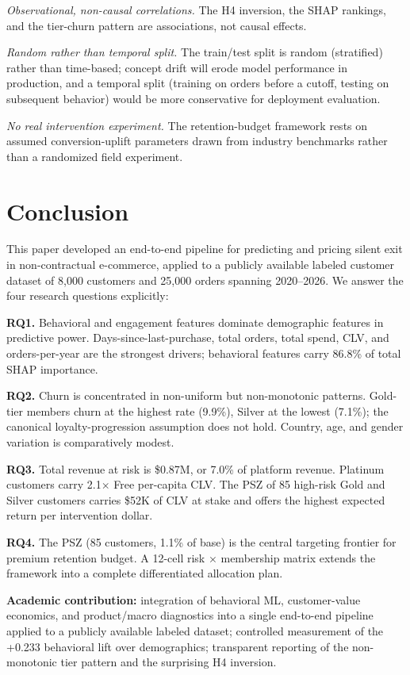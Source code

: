 \documentclass[conference]{IEEEtran}
\begin{document}
\emph{Observational, non-causal correlations.} The H4 inversion, the SHAP rankings, and the tier-churn pattern are associations, not causal effects.

\emph{Random rather than temporal split.} The train/test split is random (stratified) rather than time-based; concept drift will erode model performance in production, and a temporal split (training on orders before a cutoff, testing on subsequent behavior) would be more conservative for deployment evaluation.

\emph{No real intervention experiment.} The retention-budget framework rests on assumed conversion-uplift parameters drawn from industry benchmarks rather than a randomized field experiment.

\section{Conclusion}

This paper developed an end-to-end pipeline for predicting and pricing silent exit in non-contractual e-commerce, applied to a publicly available labeled customer dataset of 8{,}000 customers and 25{,}000 orders spanning 2020--2026. We answer the four research questions explicitly:

\textbf{RQ1.} Behavioral and engagement features dominate demographic features in predictive power. Days-since-last-purchase, total orders, total spend, CLV, and orders-per-year are the strongest drivers; behavioral features carry 86.8\% of total SHAP importance.

\textbf{RQ2.} Churn is concentrated in non-uniform but non-monotonic patterns. Gold-tier members churn at the highest rate (9.9\%), Silver at the lowest (7.1\%); the canonical loyalty-progression assumption does not hold. Country, age, and gender variation is comparatively modest.

\textbf{RQ3.} Total revenue at risk is \$0.87M, or 7.0\% of platform revenue. Platinum customers carry 2.1$\times$ Free per-capita CLV. The PSZ of 85 high-risk Gold and Silver customers carries \$52K of CLV at stake and offers the highest expected return per intervention dollar.

\textbf{RQ4.} The PSZ (85 customers, 1.1\% of base) is the central targeting frontier for premium retention budget. A 12-cell risk $\times$ membership matrix extends the framework into a complete differentiated allocation plan.

\textbf{Academic contribution:} integration of behavioral ML, customer-value economics, and product/macro diagnostics into a single end-to-end pipeline applied to a publicly available labeled dataset; controlled measurement of the +0.233 behavioral lift over demographics; transparent reporting of the non-monotonic tier pattern and the surprising H4 inversion.
\end{document}
